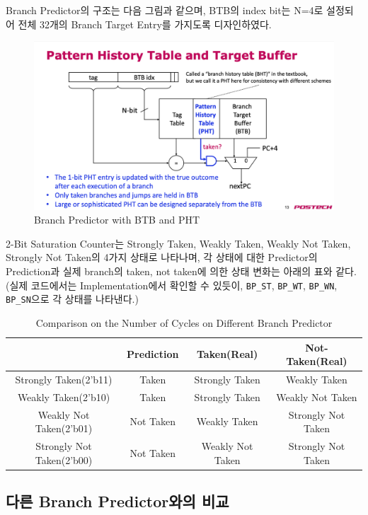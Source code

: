 \documentclass[openright, a4paper]{article}
\newcommand{\code}[1]{\texttt{#1}}
\begin{document}
Branch Predictor의 구조는 다음 그림과 같으며, BTB의 index bit는 N=4로 설정되어 전체 32개의 Branch Target Entry를 가지도록 디자인하였다.

\begin{figure}[h]
    \centering
    \includegraphics[width=0.8\linewidth]{img/branch_predictor_btb_and_pht.png}
    \caption{Branch Predictor with BTB and PHT}
\end{figure}

2-Bit Saturation Counter는 Strongly Taken, Weakly Taken, Weakly Not Taken, Strongly Not Taken의 4가지 상태로 나타나며, 각 상태에 대한 Predictor의 Prediction과 실제 branch의 taken, not taken에 의한 상태 변화는 아래의 표와 같다.
(실제 코드에서는 Implementation에서 확인할 수 있듯이, \code{BP_ST}, \code{BP_WT}, \code{BP_WN}, \code{BP_SN}으로 각 상태를 나타낸다.)

\begin{table}[!h]
  \centering
  \begin{tabular}{@{}cccc@{}}
    \hline
     & Prediction & Taken(Real) & Not-Taken(Real) \\
    \hline
    Strongly Taken(2'b11) & Taken & Strongly Taken & Weakly Taken \\
    Weakly Taken(2'b10) & Taken & Strongly Taken & Weakly Not Taken \\
    Weakly Not Taken(2'b01) & Not Taken & Weakly Taken & Strongly Not Taken \\
    Strongly Not Taken(2'b00) & Not Taken & Weakly Not Taken & Strongly Not Taken \\
    \hline
  \end{tabular}
  \caption{Comparison on the Number of Cycles on Different Branch Predictor}
  \label{tab:comparison}
\end{table}

\subsection{다른 Branch Predictor와의 비교}
\end{document}

